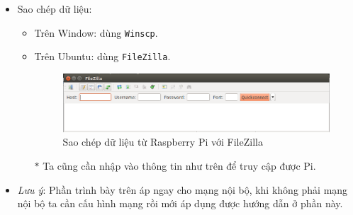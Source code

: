 \begin{itemize}
\item Sao chép dữ liệu:
\begin{itemize}
\item Trên Window: dùng \verb|Winscp|.
\item Trên Ubuntu: dùng \verb|FileZilla|.
\begin{figure}[!h]
\begin{center}
\includegraphics[scale=.45]{remote/images/FileZilla}
\end{center}
\caption{Sao chép dữ liệu từ Raspberry Pi với FileZilla}
\end{figure}
\item[$\ast$] Ta cũng cần nhập vào thông tin như trên để truy cập được Pi.
\end{itemize}
\item \textit{Lưu ý}: Phần trình bày trên áp ngay cho mạng nội bộ, khi không phải mạng nội bộ ta cần cấu hình mạng rồi mới áp dụng được hướng dẫn ở phần này.
\end{itemize}
